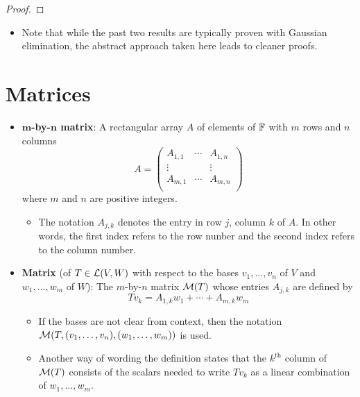 \documentclass[../main.tex]{subfiles}
\begin{document}
\begin{itemize}
\begin{theorem}
\begin{proof}
        \end{proof}
    \end{theorem}
    \begin{itemize}
        \item Note that while the past two results are typically proven with Gaussian elimination, the abstract approach taken here leads to cleaner proofs.
    \end{itemize}
\end{itemize}



\section{Matrices}
\begin{itemize}
    \item \textbf{$\bm{m}$-by-$\bm{n}$ matrix}: A rectangular array $A$ of elements of $\mathbb{F}$ with $m$ rows and $n$ columns
    \begin{equation*}
        A =
        \begin{pmatrix}
            A_{1,1} & \cdots & A_{1,n}\\
            \vdots &  & \vdots\\
            A_{m,1} & \cdots & A_{m,n}\\
        \end{pmatrix}
    \end{equation*}
    where $m$ and $n$ are positive integers.
    \begin{itemize}
        \item The notation $A_{j,k}$ denotes the entry in row $j$, column $k$ of $A$. In other words, the first index refers to the row nunber and the second index refers to the column number.
    \end{itemize}
    \item \textbf{Matrix} (of $T\in\mathcal{L}(V,W)$ with respect to the bases $v_1,\dots,v_n$ of $V$ and $w_1,\dots,w_m$ of $W$): The $m$-by-$n$ matrix $\mathcal{M}(T)$ whose entries $A_{j,k}$ are defined by
    \begin{equation*}
        Tv_k = A_{1,k}w_1+\cdots+A_{m,k}w_m
    \end{equation*}
    \begin{itemize}
        \item If the bases are not clear from context, then the notation $\mathcal{M}(T,(v_1,\dots,v_n),(w_1,\dots,w_m))$ is used.
        \item Another way of wording the definition states that the $k^\text{th}$ column of $\mathcal{M}(T)$ consists of the scalars needed to write $Tv_k$ as a linear combination of $w_1,\dots,w_m$.

\end{itemize}
\end{itemize}
\end{document}
